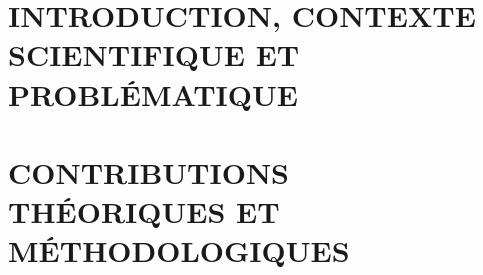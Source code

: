 \documentclass[ twoside,openright,titlepage,numbers=noenddot,%
                headinclude,cleardoublepage=empty,abstract=on,
                BCOR=5mm,paper=a4,fontsize=11pt
                ]{scrreprt}
\begin{document}
\frenchspacing
\raggedbottom
{} %
\pagestyle{plain}
%
%
%
\cleardoublepage
\pagestyle{scrheadings}
\cleardoublepage

\setcounter{secnumdepth}{3}


%
\tableofcontents %

\listoffigures %

\listoftables %



\part{INTRODUCTION, CONTEXTE SCIENTIFIQUE ET PROBLÉMATIQUE}
%


%
\part{CONTRIBUTIONS THÉORIQUES ET MÉTHODOLOGIQUES}


%


\end{document}

